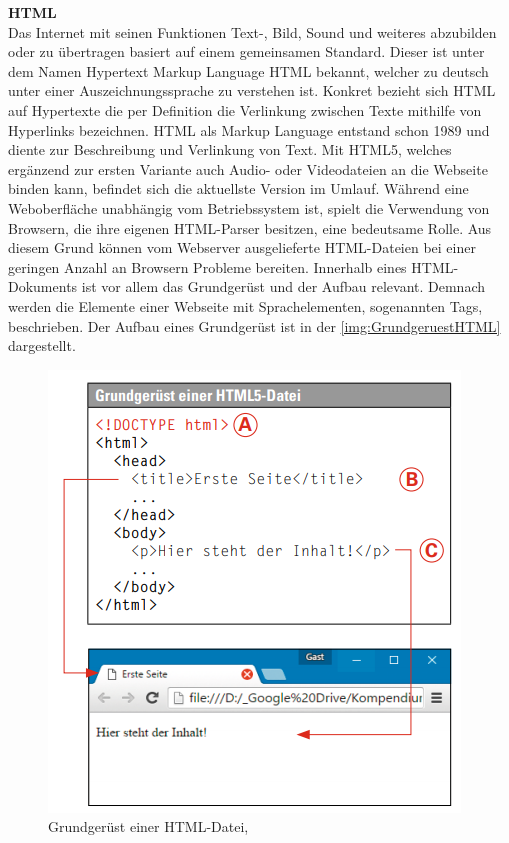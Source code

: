 \documentclass[a4paper,titlepage,halfparskip,12pt]{scrreprt}
\begin{document}
\begin{onehalfspacing}
\textbf{\ac{HTML}}\\
Das Internet mit seinen Funktionen Text-, Bild, Sound und weiteres abzubilden oder zu übertragen basiert auf einem gemeinsamen Standard. Dieser ist unter dem Namen Hypertext Markup Language \ac{HTML} bekannt, welcher zu deutsch unter einer Auszeichnungssprache zu verstehen ist. Konkret bezieht sich \ac{HTML} auf Hypertexte die per Definition die Verlinkung zwischen Texte mithilfe von Hyperlinks bezeichnen. \ac{HTML} als Markup Language entstand schon 1989 und diente zur Beschreibung und Verlinkung von Text. Mit \ac{HTML}5, welches ergänzend zur ersten Variante auch Audio- oder Videodateien an die Webseite binden kann, befindet sich die aktuellste Version im Umlauf. Während eine Weboberfläche unabhängig vom Betriebssystem ist, spielt die Verwendung von Browsern, die ihre eigenen HTML-Parser besitzen, eine bedeutsame Rolle. Aus diesem Grund können vom Webserver ausgelieferte \ac{HTML}-Dateien bei einer geringen Anzahl an Browsern Probleme bereiten. Innerhalb eines \ac{HTML}-Dokuments ist vor allem das Grundgerüst und der Aufbau relevant. Demnach werden die Elemente einer Webseite mit Sprachelementen, sogenannten Tags, beschrieben. Der Aufbau eines Grundgerüst ist in der \autoref{img:GrundgeruestHTML} dargestellt.
\begin{figure}[h]
	\centering
	\includegraphics[scale=1.3]{images/HTML_Grundgeruest}
	\caption{Grundgerüst einer HTML-Datei, \cite{buhler2017html5}}
	\label{img:GrundgeruestHTML}
\end{figure}

\end{onehalfspacing}
\end{document}
